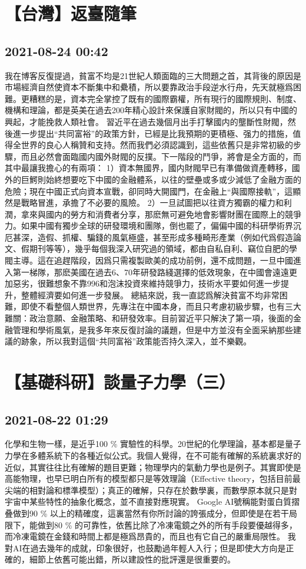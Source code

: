\documentclass[twocolumn]{ctexart}
\begin{document}
\section*{【台灣】返臺隨筆}
\subsection*{2021-08-24 00:42}

我在博客反復提過，貧富不均是21世紀人類面臨的三大問題之首，其背後的原因是市場經濟自然使資本不斷集中和纍積，所以要靠政治手段逆水行舟，先天就極爲困難。更糟糕的是，資本完全掌控了既有的國際霸權，所有現行的國際規則、制度、機構和理論，都是英美在過去200年精心設計來保護自家財閥的，所以只有中國的興起，才能挽救人類社會。
習近平在過去幾個月出手打擊國内的壟斷性財閥，然後進一步提出“共同富裕”的政策方針，已經是比我預期的更積極、强力的措施，值得全世界的良心人稱贊和支持。然而我們必須認識到，這些依舊只是非常初級的步驟，而且必然會面臨國内國外財閥的反撲。下一階段的鬥爭，將會是全方面的，而其中最讓我擔心的有兩項：
1）資本無國界，國内財閥早已有準備做資產轉移，國外的巨鰐則始終想要吃下中國的金融體系，以往的壁壘或多或少減低了金融方面的危險；現在中國正式向資本宣戰，卻同時大開國門，在金融上“與國際接軌”，這顯然是戰略冒進，承擔了不必要的風險。
2）一旦試圖把以往資方獨霸的權力和利潤，拿來與國内的勞方和消費者分享，那麽無可避免地會影響財團在國際上的競爭力。如果中國有獨步全球的研發環境和團隊，倒也罷了，偏偏中國的科研學術界沉厄甚深，造假、抓權、騙錢的風氣極盛，甚至形成多種畸形產業（例如代爲假造論文、假期刊等等），幾乎每個我深入研究過的領域，都由自私自利、竊位自肥的學閥主導。這在追趕階段，因爲只需複製歐美的成功前例，還不成問題，一旦中國進入第一梯隊，那麽美國在過去6、70年研發路綫選擇的低效現象，在中國會遠遠更加惡劣，很難想象不靠996和泡沫投資來維持競爭力，技術水平要如何進一步提升，整體經濟要如何進一步發展。
總結來説，我一直認爲解決貧富不均非常困難，即使不看整個人類世界，先專注在中國本身，而且只考慮初級步驟，也有三大難關：政治意願、金融策略、和研發效率。目前習近平只解決了第一項，後面的金融管理和學術風氣，是我多年來反復討論的議題，但是中方並沒有全面采納那些建議的跡象，所以我對這個“共同富裕”政策能否持久深入，並不樂觀。
\section*{【基礎科研】談量子力學（三）}
\subsection*{2021-08-22 01:29}

化學和生物一樣，是近乎100 \% 實驗性的科學。20世紀的化學理論，基本都是量子力學在多體系統下的各種近似公式。我個人覺得，在不可能有確解的系統裏求好的近似，其實往往比有確解的題目更難；物理學内的氣動力學也是例子。其實即使是高能物理，也早已明白所有的模型都只是等效理論（Effective theory，包括目前最尖端的相對論和標準模型）；真正的確解，只存在於數學裏，而數學原本就只是對宇宙中某些特性的抽象化概念，並不直接對應現實。
Google AI號稱能對蛋白質摺叠做到90 \% 以上的精確度，這裏當然有你所討論的誇張成分，但即使是在若干局限下，能做到80 \% 的可靠性，依舊比除了冷凍電鏡之外的所有手段要優越得多，而冷凍電鏡在金錢和時間上都是極爲昂貴的，而且也有它自己的嚴重局限性。
我對AI在過去幾年的成就，印象很好，也鼓勵過年輕人入行；但是即使大方向是正確的，細節上依舊可能出錯，所以建設性的批評還是很重要的。
\end{document}
